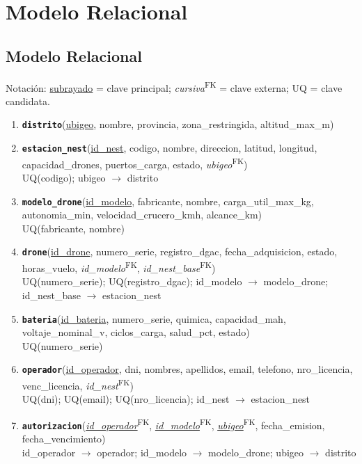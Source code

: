 \documentclass[11pt,a4paper]{article}
\newcommand{\pk}[1]{\underline{#1}}
\newcommand{\fk}[1]{\textit{#1}\textsuperscript{\tiny FK}}
\newcommand{\pkfk}[1]{\underline{\textit{#1}}\textsuperscript{\tiny FK}}
\newcommand{\tb}[1]{\textbf{\texttt{#1}}}
\begin{document}
\section{Modelo Relacional}

\subsection{Modelo Relacional}
Notación: \pk{subrayado} = clave principal; \fk{cursiva} = clave externa; UQ = clave candidata.

\begin{enumerate}[leftmargin=*, label=\arabic*.]
\item \tb{distrito}(\pk{ubigeo}, nombre, provincia, zona\_restringida, altitud\_max\_m)

\item \tb{estacion\_nest}(\pk{id\_nest}, codigo, nombre, direccion, latitud, longitud, capacidad\_drones, puertos\_carga, estado, \fk{ubigeo})\\
UQ(codigo); ubigeo $\rightarrow$ distrito

\item \tb{modelo\_drone}(\pk{id\_modelo}, fabricante, nombre, carga\_util\_max\_kg, autonomia\_min, velocidad\_crucero\_kmh, alcance\_km)\\
UQ(fabricante, nombre)

\item \tb{drone}(\pk{id\_drone}, numero\_serie, registro\_dgac, fecha\_adquisicion, estado, horas\_vuelo, \fk{id\_modelo}, \fk{id\_nest\_base})\\
UQ(numero\_serie); UQ(registro\_dgac); id\_modelo $\rightarrow$ modelo\_drone; id\_nest\_base $\rightarrow$ estacion\_nest

\item \tb{bateria}(\pk{id\_bateria}, numero\_serie, quimica, capacidad\_mah, voltaje\_nominal\_v, ciclos\_carga, salud\_pct, estado)\\
UQ(numero\_serie)

\item \tb{operador}(\pk{id\_operador}, dni, nombres, apellidos, email, telefono, nro\_licencia, venc\_licencia, \fk{id\_nest})\\
UQ(dni); UQ(email); UQ(nro\_licencia); id\_nest $\rightarrow$ estacion\_nest

\item \tb{autorizacion}(\pkfk{id\_operador}, \pkfk{id\_modelo}, \pkfk{ubigeo}, fecha\_emision, fecha\_vencimiento)\\
id\_operador $\rightarrow$ operador; id\_modelo $\rightarrow$ modelo\_drone; ubigeo $\rightarrow$ distrito


\end{enumerate}
\end{document}
